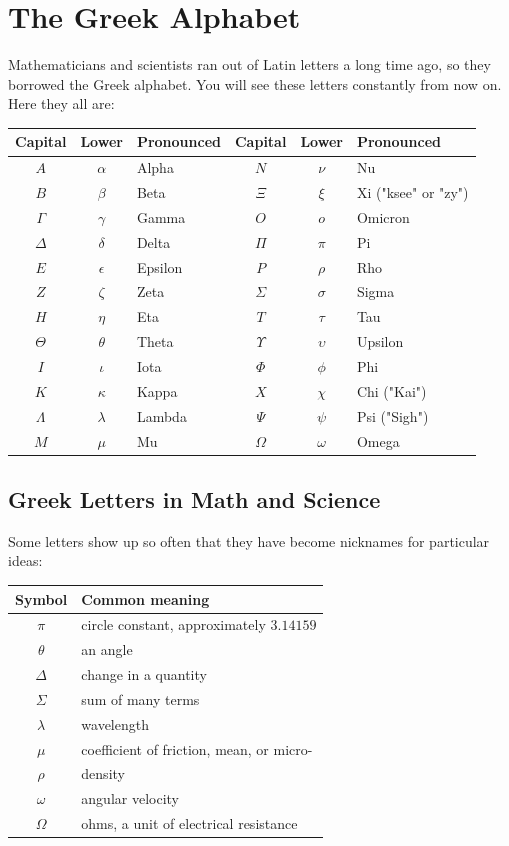 \chapter{The Greek Alphabet}

Mathematicians and scientists ran out of Latin letters a long time ago, so they borrowed the Greek alphabet. You will see these letters constantly from now on. Here they all are:

\begin{tabular}{c c  l | c c l}
Capital & Lower & Pronounced & Capital & Lower & Pronounced\\
\hline
$A$ & $\alpha$ & Alpha & $N$ & $\nu$ & Nu\\
$B$ & $\beta$ & Beta & $\Xi$ & $\xi$ & Xi ("ksee" or "zy") \\
$\Gamma$ & $\gamma$ & Gamma & $O$ & $o$ & Omicron\\
$\Delta$ & $\delta$ & Delta & $\Pi$ & $\pi$ & Pi\\
$E$ & $\epsilon$ & Epsilon & $P$ & $\rho$ & Rho\\
$Z$ & $\zeta$ & Zeta & $\Sigma$ & $\sigma$ & Sigma\\
$H$ & $\eta$ & Eta & $T$ & $\tau$ & Tau\\
$\Theta$ & $\theta$ & Theta & $\Upsilon$ & $\upsilon$ & Upsilon\\
$I$ & $\iota$ & Iota & $\Phi$ & $\phi$ & Phi\\
$K$ & $\kappa$ & Kappa & $X$ & $\chi$ & Chi ("Kai")\\
$\Lambda$ & $\lambda$ & Lambda & $\Psi$ & $\psi$ & Psi ("Sigh")\\
$M$ & $\mu$ & Mu & $\Omega$ & $\omega$ & Omega
\end{tabular}

\section{Greek Letters in Math and Science}
Some letters show up so often that they have become nicknames for particular ideas:

\begin{tabular}{c l}
Symbol & Common meaning \\
\hline
$\pi$\index{pi} & circle constant, approximately $3.14159$ \\
$\theta$\index{theta} & an angle \\
$\Delta$ & change in a quantity \\
$\Sigma$\index{summation} & sum of many terms \\
$\lambda$\index{wavelength} & wavelength \\
$\mu$ & coefficient of friction, mean, or micro- \\
$\rho$ & density \\
$\omega$\index{angular velocity} & angular velocity \\
$\Omega$\index{ohm} & ohms, a unit of electrical resistance \\
\end{tabular}

